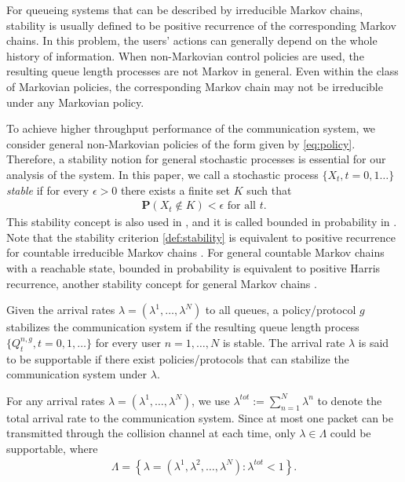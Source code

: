 \documentclass[onecolumn,draftcls]{IEEEtran}
\begin{document}
For queueing systems that can be described by irreducible Markov chains,
stability is usually defined to be positive recurrence of the corresponding Markov chains.
In this problem, the users' actions can generally depend on the whole history of information.
When non-Markovian control policies are used, the resulting queue length processes are not Markov in general.
Even within the class of Markovian policies, the corresponding Markov chain may not be irreducible under any Markovian policy.

To achieve higher throughput performance of the communication system, we consider general 
non-Markovian policies of the form given by \eqref{eq:policy}. Therefore, a stability notion for general stochastic processes is essential for our analysis of the system. 
In this paper, we call a stochastic process $\{X_t,t=0,1\dots\}$ \textit{stable} if
for every $\epsilon > 0$ there exists a finite set $K$ such that
\begin{align}
\mathbf{P}(X_t \notin K ) < \epsilon \text{ for all }t.
\label{def:stability}
\end{align}
This stability concept is also used in \cite{szpankowski1994stability,luo1999stability, borst2008stability}, and it is called bounded in probability in \cite{meyn2009markov}.
Note that the stability criterion \eqref{def:stability} is equivalent to positive recurrence for countable irreducible Markov chains \cite[Proposition 18.3.1]{meyn2009markov}. 
For general countable Markov chains with a reachable state, bounded in probability is equivalent to positive Harris recurrence, another stability concept for general Markov chains \cite[Proposition 18.3.2 ]{meyn2009markov}.





Given the arrival rates $\lambda = (\lambda^1,\dots,\lambda^N)$ to all queues, 
a policy/protocol $g$ stabilizes the communication system if the resulting queue length process
$\{Q^{n,g}_t, t=0,1,\dots\}$ for every user $n=1,\dots,N$ is stable.
The arrival rate $\lambda$ is said to be supportable if there exist policies/protocols that can stabilize the communication system under $\lambda$.

For any arrival rates $\lambda = (\lambda^1,\dots,\lambda^N)$, we use $\lambda^{tot}:=\sum_{n=1}^N \lambda^n$ to denote the total arrival rate to the communication system.
Since at most one packet can be transmitted through the collision channel at each time, only $\lambda \in \Lambda$ could be supportable, where
\begin{align}
\Lambda = \left\{\lambda = (\lambda^1,\lambda^2,\dots,\lambda^N): \lambda^{tot} < 1  \right\}.
\label{eq:throughputregion}
\end{align}
\end{document}
